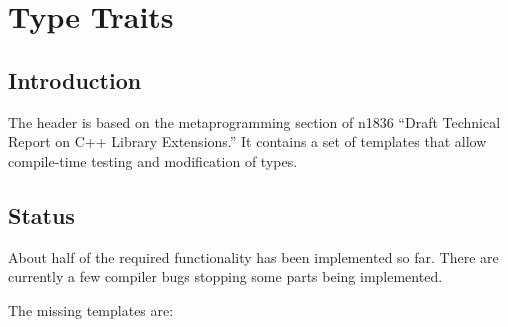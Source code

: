 
\chapter{Type Traits}

\section{Introduction}

The header  is based on the metaprogramming section of
n1836 ``Draft Technical Report on C++ Library Extensions.'' It contains a set
of templates that allow compile-time testing and modification of types.

\section{Status}

About half of the required functionality has been implemented so far. There
are currently a few compiler bugs stopping some parts being implemented.

The missing templates are:

